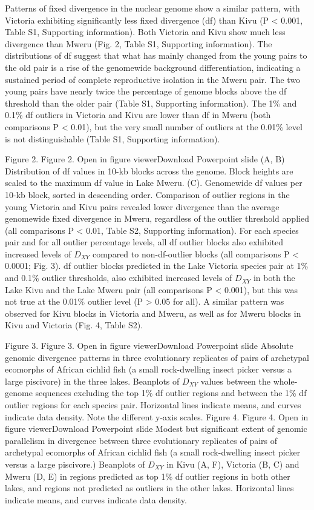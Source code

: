 Patterns of fixed divergence in the nuclear genome show a similar pattern, with Victoria exhibiting significantly less fixed divergence (df) than Kivu (P < 0.001, Table S1, Supporting information). Both Victoria and Kivu show much less divergence than Mweru (Fig. 2, Table S1, Supporting information). The distributions of df suggest that what has mainly changed from the young pairs to the old pair is a rise of the genomewide background differentiation, indicating a sustained period of complete reproductive isolation in the Mweru pair. The two young pairs have nearly twice the percentage of genome blocks above the df threshold than the older pair (Table S1, Supporting information). The 1\% and 0.1\% df outliers in Victoria and Kivu are lower than df in Mweru (both comparisons P < 0.01), but the very small number of outliers at the 0.01\% level is not distinguishable (Table S1, Supporting information).

Figure 2. 
Figure 2. Open in figure viewerDownload Powerpoint slide
(A, B) Distribution of df values in 10-kb blocks across the genome. Block heights are scaled to the maximum df value in Lake Mweru. (C). Genomewide df values per 10-kb block, sorted in descending order.
Comparison of outlier regions in the young Victoria and Kivu pairs revealed lower divergence than the average genomewide fixed divergence in Mweru, regardless of the outlier threshold applied (all comparisons P < 0.01, Table S2, Supporting information). For each species pair and for all outlier percentage levels, all df outlier blocks also exhibited increased levels of $D_{XY}$ compared to non-df-outlier blocks (all comparisons P < 0.0001; Fig. 3). df outlier blocks predicted in the Lake Victoria species pair at 1\% and 0.1\% outlier thresholds, also exhibited increased levels of $D_{XY}$ in both the Lake Kivu and the Lake Mweru pair (all comparisons P < 0.001), but this was not true at the 0.01\% outlier level (P > 0.05 for all). A similar pattern was observed for Kivu blocks in Victoria and Mweru, as well as for Mweru blocks in Kivu and Victoria (Fig. 4, Table S2).

Figure 3. 
Figure 3. Open in figure viewerDownload Powerpoint slide
Absolute genomic divergence patterns in three evolutionary replicates of pairs of archetypal ecomorphs of African cichlid fish (a small rock-dwelling insect picker versus a large piscivore) in the three lakes. Beanplots of $D_{XY}$ values between the whole-genome sequences excluding the top 1\% df outlier regions and between the 1\% df outlier regions for each species pair. Horizontal lines indicate means, and curves indicate data density. Note the different y-axis scales.
Figure 4. 
Figure 4. Open in figure viewerDownload Powerpoint slide
Modest but significant extent of genomic parallelism in divergence between three evolutionary replicates of pairs of archetypal ecomorphs of African cichlid fish (a small rock-dwelling insect picker versus a large piscivore.) Beanplots of $D_{XY}$ in Kivu (A, F), Victoria (B, C) and Mweru (D, E) in regions predicted as top 1\% df outlier regions in both other lakes, and regions not predicted as outliers in the other lakes. Horizontal lines indicate means, and curves indicate data density.